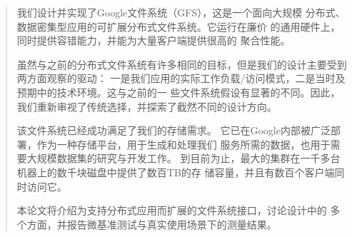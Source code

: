 \begin{abstract}
我们设计并实现了Google文件系统（GFS），这是一个面向大规模
分布式、数据密集型应用的可扩展分布式文件系统。它运行在廉价
的通用硬件上，同时提供容错能力，并能为大量客户端提供很高的
聚合性能。

虽然与之前的分布式文件系统有许多相同的目标，但是我们的设计主要受到两方面观察的驱动：
一是我们应用的实际工作负载/访问模式，二是当时及预期中的技术环境。这与之前的一
些文件系统假设有显著的不同。因此，我们重新审视了传统选择，并探索了截然不同的设计方向。

该文件系统已经成功满足了我们的存储需求。
它已在Google内部被广泛部署，作为一种存储平台，用于生成和处理我们
服务所需的数据，也用于需要大规模数据集的研究与开发工作。
到目前为止，最大的集群在一千多台机器上的数千块磁盘中提供了数百TB的存
储容量，并且有数百个客户端同时访问它。

本论文将介绍为支持分布式应用而扩展的文件系统接口，讨论设计中的
多个方面，并报告微基准测试与真实使用场景下的测量结果。
\end{abstract}
